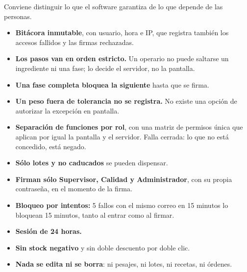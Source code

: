 
\newpage
{}

Conviene distinguir lo que el software garantiza de lo que depende de las personas.


\begin{itemize}
    \item \textbf{Bitácora inmutable}, con usuario, hora e IP, que registra también los
          accesos fallidos y las firmas rechazadas.
    \item \textbf{Los pasos van en orden estricto.} Un operario no puede saltarse un
          ingrediente ni una fase; lo decide el servidor, no la pantalla.
    \item \textbf{Una fase completa bloquea la siguiente} hasta que se firma.
    \item \textbf{Un peso fuera de tolerancia no se registra.} No existe una opción de
          autorizar la excepción en pantalla.
    \item \textbf{Separación de funciones por rol}, con una matriz de permisos única
          que aplican por igual la pantalla y el servidor. Falla cerrada: lo que no está
          concedido, está negado.
    \item \textbf{Sólo lotes \aprobado{} y no caducados} se pueden dispensar.
    \item \textbf{Firman sólo Supervisor, Calidad y Administrador}, con su propia
          contraseña, en el momento de la firma.
    \item \textbf{Bloqueo por intentos:} 5 fallos con el mismo correo en 15 minutos lo
          bloquean 15 minutos, tanto al entrar como al firmar.
    \item \textbf{Sesión de 24 horas.}
    \item \textbf{Sin stock negativo} y sin doble descuento por doble clic.
    \item \textbf{Nada se edita ni se borra}: ni pesajes, ni lotes, ni recetas, ni órdenes.
\end{itemize}



